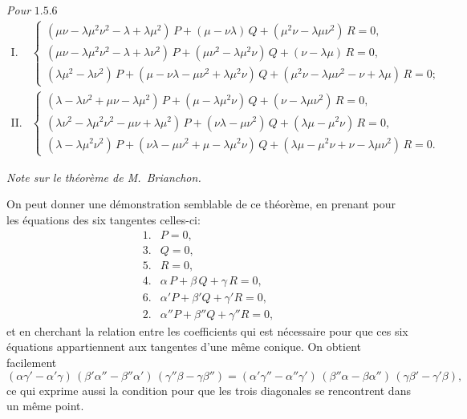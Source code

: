 \documentclass[12pt,a4paper]{article}
\theoremstyle{plain}
\begin{document}
\textit{Pour} $1.5.6$
\[
\begin{array}{ll}
\text{I.} & \begin{cases}
(\mu\nu - \lambda\mu^2\nu^2 - \lambda + \lambda\mu^2)\, P + (\mu - \nu\lambda)\, Q + (\mu^2\nu - \lambda\mu\nu^2)\, R = 0, \\[2pt]
(\mu\nu - \lambda\mu^2\nu^2 - \lambda + \lambda\nu^2)\, P + (\mu\nu^2 - \lambda\mu^2\nu)\, Q + (\nu - \lambda\mu)\, R = 0, \\[2pt]
(\lambda\mu^2 - \lambda\nu^2)\, P + (\mu - \nu\lambda - \mu\nu^2 + \lambda\mu^2\nu)\, Q + (\mu^2\nu - \lambda\mu\nu^2 - \nu + \lambda\mu)\, R = 0;
\end{cases} \\[24pt]
\text{II.} & \begin{cases}
(\lambda - \lambda\nu^2 + \mu\nu - \lambda\mu^2)\, P + (\mu - \lambda\mu^2\nu)\, Q + (\nu - \lambda\mu\nu^2)\, R = 0, \\[2pt]
(\lambda\nu^2 - \lambda\mu^2\nu^2 - \mu\nu + \lambda\mu^2)\, P + (\nu\lambda - \mu\nu^2)\, Q + (\lambda\mu - \mu^2\nu)\, R = 0, \\[2pt]
(\lambda - \lambda\mu^2\nu^2)\, P + (\nu\lambda - \mu\nu^2 + \mu - \lambda\mu^2\nu)\, Q + (\lambda\mu - \mu^2\nu + \nu - \lambda\mu\nu^2)\, R = 0.
\end{cases}
\end{array}
\]

\begin{center}\textit{Note sur le th\'eor\`eme de M.~Brianchon.}\end{center}

On peut donner une d\'emonstration semblable de ce th\'eor\`eme, en prenant pour les \'equations des six tangentes celles-ci:
\[
\begin{array}{rl}
1. & P = 0, \\
3. & Q = 0, \\
5. & R = 0, \\
4. & \alpha\, P + \beta\, Q + \gamma\, R = 0, \\
6. & \alpha' P + \beta' Q + \gamma' R = 0, \\
2. & \alpha'' P + \beta'' Q + \gamma'' R = 0,
\end{array}
\]
et en cherchant la relation entre les coefficients qui est n\'ecessaire pour que ces six \'equations appartiennent aux tangentes d'une m\^eme conique. On obtient facilement
\[
(\alpha\gamma' - \alpha'\gamma)\,(\beta'\alpha'' - \beta''\alpha')\,(\gamma''\beta - \gamma\beta'') = (\alpha'\gamma'' - \alpha''\gamma')\,(\beta''\alpha - \beta\alpha'')\,(\gamma\beta' - \gamma'\beta),
\]
ce qui exprime aussi la condition pour que les trois diagonales se rencontrent dans un m\^eme point.
\end{document}
